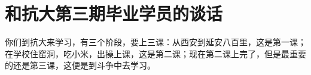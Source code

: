 \section[和抗大第三期毕业学员的谈话（一九三八年九月）]{和抗大第三期毕业学员的谈话}


你们到抗大来学习，有三个阶段，要上三课：从西安到延安八百里，这是第一课；在学校住窑洞，吃小米，出操上课，这是第二课；现在第二课上完了，但是最重要的还是第三课，这便是到斗争中去学习。

